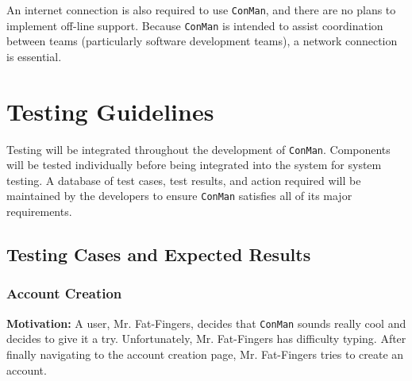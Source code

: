 \documentclass{article}
\begin{document}
An internet connection is also required to use \texttt{ConMan}, and there are no plans to implement off-line support.
Because \texttt{ConMan} is intended to assist coordination between teams (particularly software development teams), a network connection is essential.
\newpage
\section{Testing Guidelines}
Testing will be integrated throughout the development of \texttt{ConMan}.  Components will be tested individually before being integrated into the system for system testing.
A database of test cases, test results, and action required will be maintained by the developers to ensure \texttt{ConMan} satisfies all of its major requirements.

\subsection{Testing Cases and Expected Results}
\subsubsection{Account Creation}
\textbf{Motivation:}  A user, Mr. Fat-Fingers, decides that \texttt{ConMan} sounds really cool and decides to give it a try.  Unfortunately, Mr. Fat-Fingers has difficulty typing.  After finally navigating to the account creation page, Mr. Fat-Fingers tries to create an account.  
\end{document}
